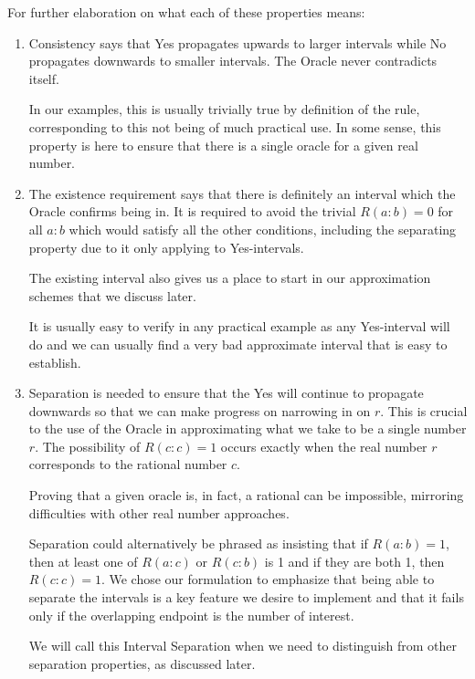 \documentclass[12pt]{article}
\begin{document}
For further elaboration on what each of these properties means:

\begin{enumerate}

    \item Consistency says that Yes propagates upwards to larger intervals while No propagates downwards to smaller intervals. The Oracle never contradicts itself. 
    
    In our examples, this is usually trivially true by definition of the rule, corresponding to this not being of much practical use. In some sense, this property is here to ensure that there is a single oracle for a given real number.  

    \item The existence requirement says that there is definitely an interval which the Oracle confirms being in. It is required to avoid the trivial $R(a:b) = 0$ for all $a:b$ which would satisfy all the other conditions, including the separating property due to it only applying to Yes-intervals. 
    
    The existing interval also gives us a place to start in our approximation schemes that we discuss later. 
    
    It is usually easy to verify in any practical example as any Yes-interval will do and we can usually find a very bad approximate interval that is easy to establish.  

    \item Separation is needed to ensure that the Yes will continue to propagate downwards so that we can make progress on narrowing in on $r$. This is crucial to the use of the Oracle in approximating what we take to be a single number $r$. The possibility of $R(c:c) = 1$ occurs exactly when the real number $r$ corresponds to the rational number $c$. 
    
    Proving that a given oracle is, in fact, a rational can be impossible, mirroring difficulties with other real number approaches. 

    Separation could alternatively be phrased as insisting that if $R(a:b) = 1$, then at least one of $R(a:c)$ or $R(c:b)$ is 1 and if they are both 1, then $R(c:c) = 1$. We chose our formulation to emphasize that being able to separate the intervals is a key feature we desire to implement and that it fails only if the overlapping endpoint is the number of interest. 

    We will call this Interval Separation when we need to distinguish from other separation properties, as discussed later. 


\end{enumerate}
\end{document}
